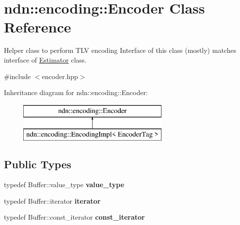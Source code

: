 \hypertarget{classndn_1_1encoding_1_1Encoder}{}\section{ndn\+:\+:encoding\+:\+:Encoder Class Reference}
\label{classndn_1_1encoding_1_1Encoder}


Helper class to perform T\+LV encoding Interface of this class (mostly) matches interface of \hyperlink{classndn_1_1encoding_1_1Estimator}{Estimator} class.  




{\ttfamily \#include $<$encoder.\+hpp$>$}

Inheritance diagram for ndn\+:\+:encoding\+:\+:Encoder\+:\begin{figure}[H]
\begin{center}
\leavevmode
\includegraphics[height=2.000000cm]{classndn_1_1encoding_1_1Encoder}
\end{center}
\end{figure}
\subsection*{Public Types}
\begin{DoxyCompactItemize}
\item 
typedef Buffer\+::value\+\_\+type {\bfseries value\+\_\+type}\hypertarget{classndn_1_1encoding_1_1Encoder_a9299bb5e4f75ae4d6317af098f77eab2}{}\label{classndn_1_1encoding_1_1Encoder_a9299bb5e4f75ae4d6317af098f77eab2}

\item 
typedef Buffer\+::iterator {\bfseries iterator}\hypertarget{classndn_1_1encoding_1_1Encoder_a63096403e5420d473c1225a3a10a454f}{}\label{classndn_1_1encoding_1_1Encoder_a63096403e5420d473c1225a3a10a454f}

\item 
typedef Buffer\+::const\+\_\+iterator {\bfseries const\+\_\+iterator}\hypertarget{classndn_1_1encoding_1_1Encoder_a49318fee170789d2ec1fb28dfb9def30}{}\label{classndn_1_1encoding_1_1Encoder_a49318fee170789d2ec1fb28dfb9def30}

\end{DoxyCompactItemize}
